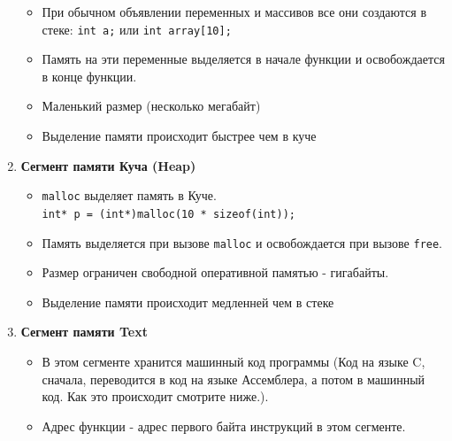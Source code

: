 \documentclass{article}
\begin{document}
\begin{multicols}{2}
\begin{enumerate}
\begin{itemize}
\item При обычном объявлении переменных и массивов все они создаются в стеке: \texttt{int a;} или \texttt{int array[10];}
\item Память на эти переменные выделяется в начале функции и освобождается в конце функции.
\item Маленький размер (несколько мегабайт)
\item Выделение памяти происходит быстрее чем в куче
\end{itemize}
\item \textbf{Сегмент памяти Куча (Heap)} \\
\begin{itemize}
\item \texttt{malloc} выделяет память в Куче. \\
\texttt{int* p = (int*)malloc(10 * sizeof(int));}
\item Память выделяется при вызове \texttt{malloc} и освобождается при вызове \texttt{free}.
\item Размер ограничен свободной оперативной памятью - гигабайты.
\item Выделение памяти происходит медленней чем в стеке
\end{itemize}
\item \textbf{Сегмент памяти Text} \\
\begin{itemize}
\item В этом сегменте хранится машинный код программы (Код на языке C, сначала, переводится в код на языке Ассемблера, а потом в машинный код. Как это происходит смотрите ниже.).
\item Адрес функции - адрес первого байта инструкций в этом сегменте.
\end{itemize}
\end{enumerate}
\end{multicols}
\end{document}
